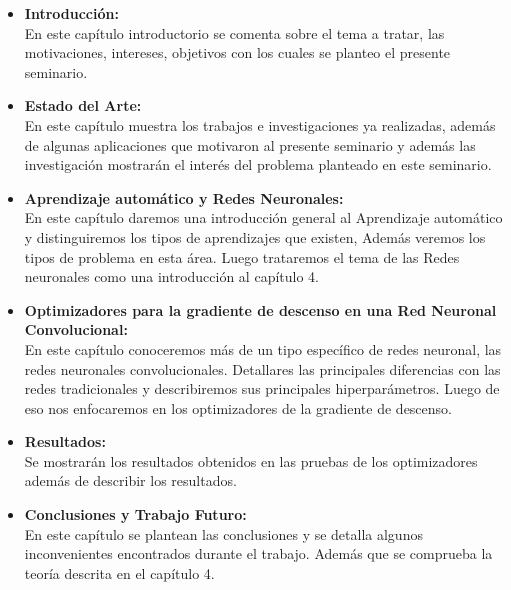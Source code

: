\begin{itemize}

\item \textbf{Introducción:} \\
En este capítulo introductorio se comenta sobre el tema a tratar, las motivaciones, intereses, objetivos con los cuales se planteo el presente seminario.

\item \textbf{Estado del Arte:} \\
En este capítulo muestra los trabajos e investigaciones ya realizadas, además de algunas aplicaciones que motivaron al presente seminario y además las investigación mostrarán el interés del problema planteado en este seminario.

\item \textbf{Aprendizaje automático y Redes Neuronales:} \\
En este capítulo daremos una introducción general al Aprendizaje automático y distinguiremos los tipos de aprendizajes que existen, Además veremos los tipos de problema en esta área. Luego trataremos el tema de las Redes neuronales como una introducción al capítulo 4.
\item \textbf{Optimizadores para la gradiente de descenso en una Red Neuronal Convolucional:} \\
En este capítulo conoceremos más de un tipo específico de redes neuronal, las redes neuronales convolucionales. Detallares las principales diferencias con las redes tradicionales y describiremos sus principales hiperparámetros. Luego de eso nos enfocaremos en los optimizadores de la gradiente de descenso.
\item \textbf{Resultados:} \\
Se mostrarán los resultados obtenidos en las pruebas de los optimizadores además de describir los resultados.
\item \textbf{Conclusiones y Trabajo Futuro:} \\
En este capítulo se plantean las conclusiones y se detalla algunos inconvenientes encontrados durante el trabajo. Además que se comprueba la teoría descrita en el capítulo 4.


\end{itemize}



